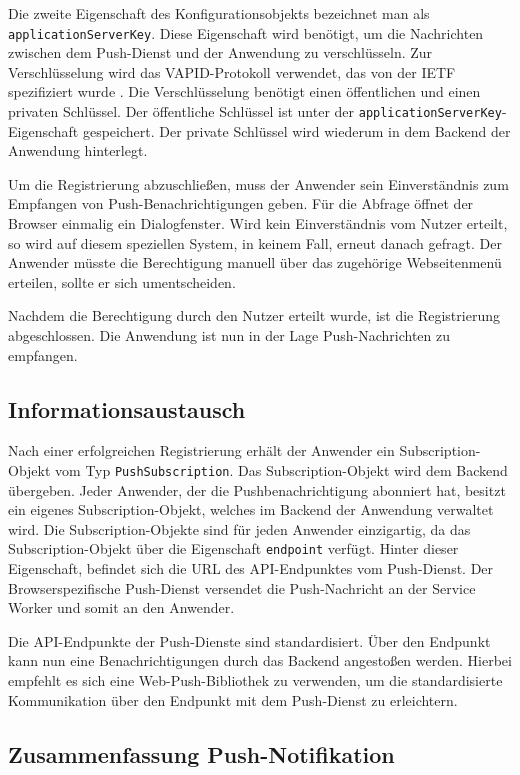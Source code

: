 Die zweite Eigenschaft des Konfigurationsobjekts bezeichnet man als \texttt{applicationServerKey}. Diese Eigenschaft wird benötigt, um die Nachrichten zwischen dem Push-Dienst und der Anwendung zu verschlüsseln. Zur Verschlüsselung wird das \ac{VAPID}-Protokoll verwendet, das von der IETF spezifiziert wurde \cite{rfc8292}. Die Verschlüsselung benötigt einen öffentlichen und einen privaten Schlüssel. Der öffentliche Schlüssel ist unter der \texttt{applicationServerKey}-Eigenschaft gespeichert. Der private Schlüssel wird wiederum in dem Backend der Anwendung hinterlegt. 

Um die Registrierung abzuschließen, muss der Anwender sein Einverständnis zum Empfangen von Push-Benachrichtigungen geben. Für die Abfrage öffnet der Browser einmalig ein Dialogfenster. Wird kein Einverständnis vom Nutzer erteilt, so wird auf diesem speziellen System, in keinem Fall, erneut danach gefragt. Der Anwender müsste die Berechtigung manuell über das zugehörige Webseitenmenü erteilen, sollte er sich umentscheiden. 

Nachdem die Berechtigung durch den Nutzer erteilt wurde, ist die Registrierung abgeschlossen. Die Anwendung ist nun in der Lage Push-Nachrichten zu empfangen. 

\subsection{Informationsaustausch}

Nach einer erfolgreichen Registrierung erhält der Anwender ein Subscription-Objekt vom Typ \texttt{PushSubscription}.
Das Subscription-Objekt wird dem Backend übergeben. Jeder Anwender, der die Pushbenachrichtigung abonniert hat, besitzt ein eigenes Subscription-Objekt, welches im Backend der Anwendung verwaltet wird. 
Die Subscription-Objekte sind für jeden Anwender einzigartig, da das Subscription-Objekt über die Eigenschaft \texttt{endpoint} verfügt. Hinter dieser Eigenschaft, befindet sich die URL des API-Endpunktes vom Push-Dienst. Der Browserspezifische Push-Dienst versendet die Push-Nachricht an der Service Worker und somit an den Anwender. 

Die API-Endpunkte der Push-Dienste sind standardisiert. Über den Endpunkt kann nun eine Benachrichtigungen durch das Backend angestoßen werden. Hierbei empfehlt es sich eine Web-Push-Bibliothek zu verwenden, um die standardisierte Kommunikation über den Endpunkt mit dem Push-Dienst zu erleichtern. 

\subsection{Zusammenfassung Push-Notifikation}

